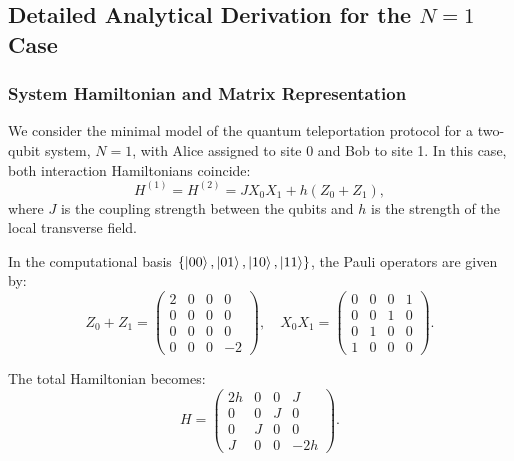 \subsection{Detailed Analytical Derivation for the \texorpdfstring{$N=1$}{N=1} Case}

\subsubsection{System Hamiltonian and Matrix Representation}

We consider the minimal model of the quantum teleportation protocol for a two-qubit system, \( N = 1 \), with Alice assigned to site 0 and Bob to site 1. In this case, both interaction Hamiltonians coincide:
\begin{equation}
    H^{(1)} = H^{(2)} = J X_0 X_1 + h(Z_0 + Z_1),
\end{equation}
where \( J \) is the coupling strength between the qubits and \( h \) is the strength of the local transverse field.

In the computational basis \( \{ \ket{00}, \ket{01}, \ket{10}, \ket{11} \} \), the Pauli operators are given by:
\begin{equation*}
Z_0 + Z_1 = 
\begin{pmatrix}
2 & 0 & 0 & 0 \\
0 & 0 & 0 & 0 \\
0 & 0 & 0 & 0 \\
0 & 0 & 0 & -2
\end{pmatrix}, \quad
X_0 X_1 =
\begin{pmatrix}
0 & 0 & 0 & 1 \\
0 & 0 & 1 & 0 \\
0 & 1 & 0 & 0 \\
1 & 0 & 0 & 0
\end{pmatrix}.
\end{equation*}

The total Hamiltonian becomes:
\begin{equation}
H =
\begin{pmatrix}
2h & 0 & 0 & J \\
0 & 0 & J & 0 \\
0 & J & 0 & 0 \\
J & 0 & 0 & -2h
\end{pmatrix}.
\end{equation}

